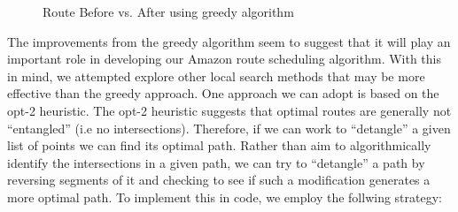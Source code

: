\documentclass[letterpaper]{article}
\begin{document}
    \begin{figure}[h]
        \caption{Route Before vs. After using greedy algorithm}
        \label{figure:greedy_method}
        \begin{minipage}{0.45\linewidth}
        \end{minipage}
        \begin{minipage}{0.5\linewidth}
        \end{minipage}

    \end{figure}

    The improvements from the greedy algorithm seem to suggest that it 
    will play an important role in developing our Amazon route scheduling 
    algorithm. With this in mind, we attempted explore other local search methods that may be more effective than the greedy approach. One approach we can adopt is based on the opt-2 
    heuristic. The opt-2 heuristic suggests that optimal routes are generally 
    not “entangled” (i.e no intersections). Therefore, if we can work to “detangle” 
    a given list of points we can find its optimal path. Rather than aim to algorithmically identify the intersections in a given path, 
    we can try to “detangle” a path by reversing segments of it and checking to 
    see if such a modification generates a more optimal path. To implement this in code, we employ the follwing strategy:
\end{document}
